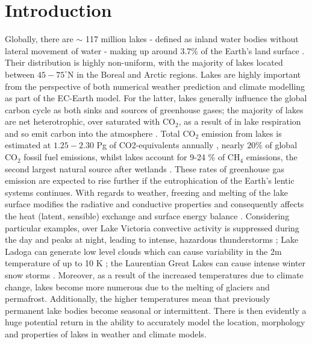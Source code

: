 \documentclass[hess, twostagejnl]{copernicus}
\begin{document}
\section{Introduction}
\noindent Globally, there are $\sim$ 117 million lakes - defined as inland water bodies without lateral movement of water - making up around 3.7$\%$ of the Earth's land surface \citep{Verpoorter2014}. Their distribution is highly non-uniform, with the majority of lakes located between $45-75^{\circ}$N in the Boreal and Arctic regions. Lakes are highly important from the perspective of both numerical weather prediction and climate modelling as part of the EC-Earth model. For the latter, lakes generally influence the global carbon cycle as both sinks and sources of greenhouse gases; the majority of lakes are net heterotrophic, over saturated with CO$_2$, as a result of in lake respiration and so emit carbon into the atmosphere \citep{Pace2005,Tranvik2009}.  Total CO$_2$ emission from lakes is estimated at $1.25 - 2.30$ Pg of CO2-equivalents annually \citep{DelSontro2018}, nearly $20 \%$ of global CO$_2$ fossil fuel emissions, whilst lakes account for 9-24 $\%$  of CH$_4$ emissions, the second largest natural source after wetlands \citep{Saunois2020}. These rates of greenhouse gas emission are expected to rise further if the eutrophication of the Earth's lentic systems continues. With regards to weather, freezing and melting of the lake surface modifies the radiative and conductive properties and consequently affects the heat (latent, sensible) exchange and surface energy balance \citep{Huang2019,Peng2020,Franz2018}. Considering particular examples, over Lake Victoria convective activity is suppressed during the day and peaks at night, leading to intense, hazardous thunderstorms \citep{Thiery2015,Thiery_2017}; Lake Ladoga can generate low level clouds which can cause variability in the 2m temperature of up to 10 K \citep{Eerola2014}; the Laurentian Great Lakes can cause intense winter snow storms \citep{Notaro2013,Vavrus2013}. Moreover, as a result of the increased temperatures due to climate change, lakes become more numerous due to the melting of glaciers and permafrost. Additionally, the higher temperatures mean that previously permanent lake bodies become seasonal or intermittent. There is then evidently a huge potential return in the ability to accurately model the location, morphology and properties of lakes in weather and climate models. \newline 
\end{document}
